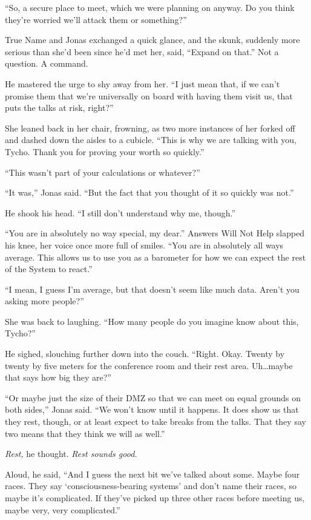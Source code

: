 ``So, a secure place to meet, which we were planning on anyway. Do you think they're worried we'll attack them or something?''

True Name and Jonas exchanged a quick glance, and the skunk, suddenly more serious than she'd been since he'd met her, said, ``Expand on that.'' Not a question. A command.

He mastered the urge to shy away from her. ``I just mean that, if we can't promise them that we're universally on board with having them visit us, that puts the talks at risk, right?''

She leaned back in her chair, frowning, as two more instances of her forked off and dashed down the aisles to a cubicle. ``This is why we are talking with you, Tycho. Thank you for proving your worth so quickly.''

``This wasn't part of your calculations or whatever?''

``It was,'' Jonas said. ``But the fact that you thought of it so quickly was not.''

He shook his head. ``I still don't understand why me, though.''

``You are in absolutely no way special, my dear.'' Answers Will Not Help slapped his knee, her voice once more full of smiles. ``You are in absolutely all ways average. This allows us to use you as a barometer for how we can expect the rest of the System to react.''

``I mean, I guess I'm average, but that doesn't seem like much data. Aren't you asking more people?''

She was back to laughing. ``How many people do you imagine know about this, Tycho?''

He sighed, slouching further down into the couch. ``Right. Okay. Twenty by twenty by five meters for the conference room and their rest area. Uh\ldots maybe that says how big they are?''

``Or maybe just the size of their DMZ so that we can meet on equal grounds on both sides,'' Jonas said. ``We won't know until it happens. It does show us that they rest, though, or at least expect to take breaks from the talks. That they say two means that they think we will as well.''

\emph{Rest,} he thought. \emph{Rest sounds good.}

Aloud, he said, ``And I guess the next bit we've talked about some. Maybe four races. They say `consciousness-bearing systems' and don't name their races, so maybe it's complicated. If they've picked up three other races before meeting us, maybe very, very complicated.''

